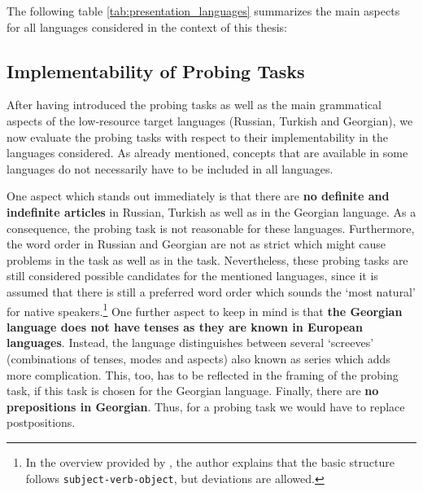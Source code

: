 The following table \vref{tab:presentation_languages} summarizes the main aspects for all languages considered in the context of this thesis:



\subsection{Implementability of Probing Tasks}
\label{sec:probing_tasks_implementability}

After having introduced the probing tasks as well as the main grammatical aspects of the low-resource target languages (Russian, Turkish and Georgian), we now evaluate the probing tasks with respect to their implementability in the languages considered. As already mentioned, concepts that are available in some languages do not necessarily have to be included in all languages.

One aspect which stands out immediately is that there are \textbf{no definite and indefinite articles} in Russian, Turkish as well as in the Georgian language. As a consequence, the  probing task is not reasonable for these languages. Furthermore, the word order in Russian and Georgian are not as strict which might cause problems in the  task as well as in the  task. Nevertheless, these probing tasks are still considered possible candidates for the mentioned languages, since it is assumed that there is still a preferred word order which sounds the `most natural' for native speakers.\footnote{In the overview provided by \citep{Makharoblidze}, the author explains that the basic structure follows \texttt{subject-verb-object}, but deviations are allowed.} One further aspect to keep in mind is that \textbf{the Georgian language does not have tenses as they are known in European languages}. Instead, the language distinguishes between several `screeves' (combinations of tenses, modes and aspects) also known as series which adds more complication. This, too, has to be reflected in the framing of the  probing task, if this task is chosen for the Georgian language. Finally, there are \textbf{no prepositions in Georgian}. Thus, for a  probing task we would have to replace postpositions.

